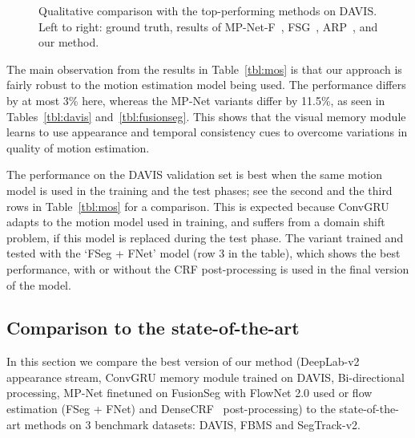 \begin{figure*}[t]
\begin{center}
\vspace{0.1cm}
\vspace{0.1cm}
\vspace{0.1cm}
\end{center}
\vspace{-0.3cm}\caption{Qualitative comparison with the top-performing methods
on DAVIS. Left to right: ground truth, results of
MP-Net-F~\cite{tokmakov2016learning}, FSG~\cite{jain2017fusionseg},
ARP~\cite{kohprimary}, and our method.}
\label{fig:davis}
\end{figure*}
The main observation from the results in Table~\ref{tbl:mos} is that our
approach is fairly robust to the motion estimation model being used.
The
performance differs by at most 3\% here, whereas the MP-Net variants
differ by 11.5\%, as seen in Tables~\ref{tbl:davis} and~\ref{tbl:fusionseg}.
This shows that the visual memory module learns to use appearance and temporal
consistency cues to overcome variations in quality of motion estimation.

The performance on the DAVIS validation set is best when the same motion model
is used in the training and the test phases; see the second and the third rows
in Table~\ref{tbl:mos} for a comparison. This is expected because ConvGRU
adapts to the motion model used in training, and suffers from a domain shift
problem, if this model is replaced during the test phase. The variant trained
and tested with the `FSeg + FNet' model (row 3 in the table), which shows the
best performance, with or without the CRF post-processing is used in the
final version of the model.

\subsection{Comparison to the state-of-the-art}
\label{sec:soa}

In this section we compare the best version of our method (DeepLab-v2 appearance stream, ConvGRU memory module trained on DAVIS,
Bi-directional processing, MP-Net finetuned on FusionSeg with FlowNet 2.0 used or flow estimation (FSeg + FNet) and DenseCRF~\cite{krahenbuhl2011efficient} post-processing) to the state-of-the-art methods on 3 benchmark datasets: DAVIS, FBMS and SegTrack-v2.


